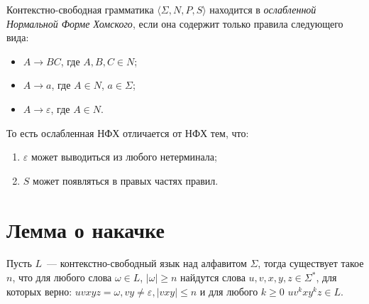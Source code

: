 \begin{definition}
    \label{defn:wCNF}
    Контекстно-свободная грамматика $\langle \Sigma, N, P, S\rangle$ находится в \emph{ослабленной Нормальной Форме Хомского}, если она содержит только правила следующего вида:
    \begin{itemize}
        \item $A \to B C$, где $A, B, C \in N$;
        \item $A \to a$, где $A \in N$, $a \in \Sigma$;
        \item $A \to \varepsilon$, где $A \in N$.
    \end{itemize}

    То есть ослабленная НФХ отличается от НФХ тем, что:
    \begin{enumerate}
        \item $\varepsilon$ может выводиться из любого нетерминала;
        \item $S$ может появляться в правых частях правил.
    \end{enumerate}
\end{definition}

\section{Лемма о накачке}

\begin{lemma}
    Пусть $L$~--- контекстно-свободный язык над алфавитом $\Sigma$, тогда существует такое $n$, что для любого слова $\omega \in L$, $|\omega| \geq n$ найдутся слова $u,v,x,y,z\in \Sigma^*$, для которых верно: $uvxyz = \omega, vy\neq \varepsilon,|vxy|\leq n$ и для любого $k \geq 0$  $uv^kxy^kz \in L$.
\end{lemma}


